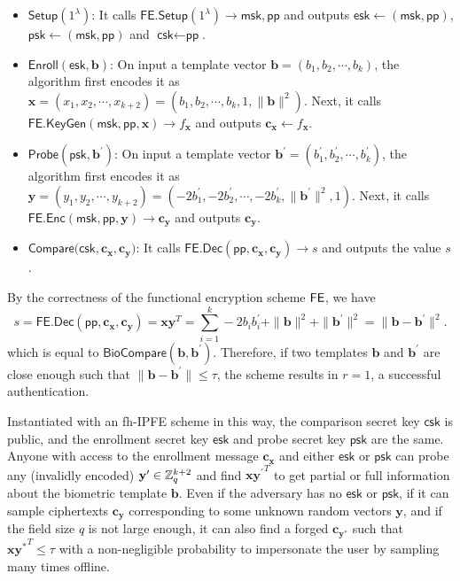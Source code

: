 \begin{itemize}

	\item $\textsf{Setup}(1^\lambda)$: It calls $\textsf{FE.Setup}(1^\lambda) \to \textsf{msk}, \textsf{pp}$ and outputs $\textsf{esk} \gets (\textsf{msk}, \textsf{pp})$, $\textsf{psk} \gets (\textsf{msk}, \textsf{pp})$ and $\textsf{csk} \gets \textsf{pp}$.

	\item $\textsf{Enroll}(\textsf{esk}, \mathbf{b})$: On input a template vector $\mathbf{b} = (b_1, b_2, \cdots, b_k)$, the algorithm first encodes it as $\mathbf{x} = (x_1, x_2, \cdots, x_{k+2}) = (b_1, b_2, \cdots, b_k, 1, \|\mathbf{b}\|^2)$. Next, it calls $\textsf{FE.KeyGen}(\textsf{msk}, \textsf{pp}, \mathbf{x}) \to f_\mathbf{x}$ and outputs $\mathbf{c_x} \gets f_\mathbf{x}$.

	\item $\textsf{Probe}(\textsf{psk}, \mathbf{b}^\prime)$: On input a template vector $\mathbf{b}^\prime = (b_1^\prime, b_2^\prime, \cdots, b_k^\prime)$, the algorithm first encodes it as $\mathbf{y} = (y_1, y_2, \cdots, y_{k+2}) = (-2b_1^\prime, -2b_2^\prime, \cdots, -2b_k^\prime, \|\mathbf{b}^\prime\|^2, 1)$. Next, it calls $\textsf{FE.Enc}(\textsf{msk}, \textsf{pp}, \mathbf{y}) \to \mathbf{c_y}$ and outputs $\mathbf{c_y}$.

	\item $\textsf{Compare}(\textsf{csk}, \mathbf{c_x}, \mathbf{c_y)}$: It calls $\textsf{FE.Dec}(\textsf{pp}, \mathbf{c_x}, \mathbf{c_y}) \to s$ and outputs the value $s$.

\end{itemize}

By the correctness of the functional encryption scheme $\sf FE$, we have
\[
	s = \textsf{FE.Dec}(\textsf{pp}, \mathbf{c_x}, \mathbf{c_y}) =  \mathbf{x} \mathbf{y}^T = \sum_{i=1}^k -2b_ib_i^\prime + \|\mathbf{b}\|^2 + \|\mathbf{b}^\prime\|^2 = \| \mathbf{b} - \mathbf{b}^\prime \|^2.
\]
which is equal to $\textsf{BioCompare}(\mathbf{b}, \mathbf{b}^\prime)$. Therefore, if two templates $\mathbf{b}$ and $\mathbf{b}^\prime$ are close enough such that $\|\mathbf{b} - \mathbf{b}^\prime\| \leq \tau$, the scheme results in $r = 1$, a successful authentication.

Instantiated with an fh-IPFE scheme in this way, the comparison secret key $\textsf{csk}$ is public, and the enrollment secret key $\textsf{esk}$ and probe secret key $\textsf{psk}$ are the same. Anyone with access to the enrollment message $\mathbf{c_x}$ and either $\textsf{esk}$ or $\textsf{psk}$ can probe any (invalidly encoded) $\mathbf{y}^{\prime} \in \mathbb{Z}_q^{k+2}$ and find $\mathbf{x} {\mathbf{y}^\prime}^T$ to get partial or full information about the biometric template $\mathbf{b}$. Even if the adversary has no $\textsf{esk}$ or $\textsf{psk}$, if it can sample ciphertexts $\mathbf{c_{y}}$ corresponding to some unknown random vectors $\mathbf{y}$, and if the field size $q$ is not large enough, it can also find a forged $\mathbf{c_{y^*}}$ such that $\mathbf{x}\mathbf{y^*}^T \leq \tau$ with a non-negligible probability to impersonate the user by sampling many times offline.

